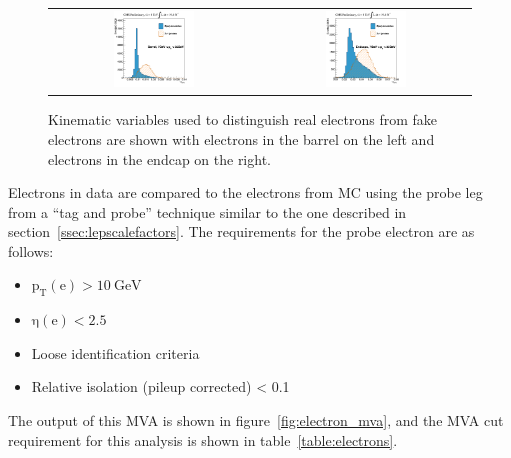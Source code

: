 \begin{figure}[!htb]
\begin{center}
\begin{tabular}{cc}
      \includegraphics[width=0.4\textwidth]{evtsel/figs/see_EB_LowPt.pdf} &
      \includegraphics[width=0.4\textwidth]{evtsel/figs/see_EE_LowPt.pdf} \\      
    \end{tabular}
    \caption{
      \label{fig:electron_mva_vars}
      Kinematic variables used to distinguish real electrons from fake electrons are shown
      with electrons in the barrel on the left and electrons in the endcap on the right.
    }
  \end{center}
\end{figure}
  
Electrons in data are compared to the electrons from MC using the probe leg from a
``tag and probe'' technique similar to the one described in section~\ref{ssec:lepscalefactors}.
The requirements for the probe electron are as follows:
\begin{itemize}
\item $\mathrm{p_{T}(e) > 10~GeV}$
\item $\mathrm{\eta(e) < 2.5}$
\item Loose identification criteria
\item Relative isolation (pileup corrected) < 0.1
\end{itemize}
The output of this MVA is shown in figure~\ref{fig:electron_mva},
and the MVA cut requirement for this analysis is shown in table~\ref{table:electrons}.
  
